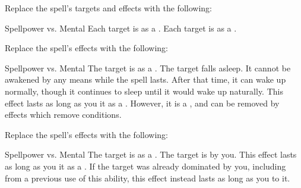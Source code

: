 Replace the spell's targets and effects with the following:
\begin{spellcontent}
\begin{augmenttargetinginfo}
\end{augmenttargetinginfo}
\begin{augmenteffects}
\begin{spellattack}{Spellpower vs. Mental}
\spellsuccess Each target is \disoriented as a .
\spellcritical Each target is \confused as a .
\end{spellattack}
\end{augmenteffects}
\end{spellcontent}
Replace the spell's effects with the following:
\begin{spellcontent}
\begin{augmenteffects}
\begin{spellattack}{Spellpower vs. Mental}
\spellsuccess The target is \blinded as a .
\spellcritical
The target falls asleep.
It cannot be awakened by any means while the spell lasts.
After that time, it can wake up normally, though it continues to sleep until it would wake up naturally.
This effect lasts as long as you  it as a .
However, it is a , and can be removed by effects which remove conditions.
\end{spellattack}
\end{augmenteffects}
\end{spellcontent}
Replace the spell's effects with the following:
\begin{spellcontent}
\begin{augmenteffects}
\begin{spellattack}{Spellpower vs. Mental}
\spellsuccess
The target is  as a .
\spellcritical
The target is  by you.
This effect lasts as long as you  it as a .
If the target was already dominated by you, including from a previous use of this ability, this effect instead lasts as long as you  to it.
\end{spellattack}
\end{augmenteffects}
\end{spellcontent}
